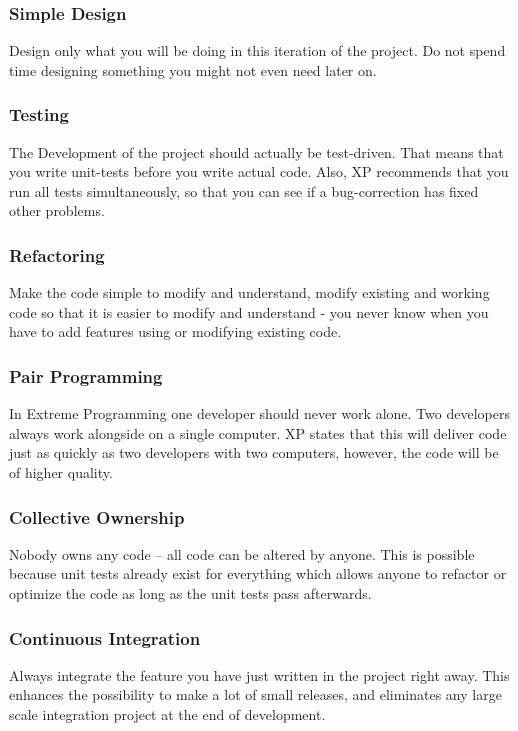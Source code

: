 \subsubsection{Simple Design}
Design only what you will be doing in this iteration of the project. Do not spend time designing something you might not even need later on.

\subsubsection{Testing}
The Development of the project should actually be test-driven.
That means that you write unit-tests before you write actual code.
Also, XP recommends that you run all tests simultaneously, so that you can see if a bug-correction has fixed other problems.

\subsubsection{Refactoring}
Make the code simple to modify and understand, modify existing and working code so that it is easier to modify and understand - you never know when you have to add features using or modifying existing code.

\subsubsection{Pair Programming}
In Extreme Programming one developer should never work alone. Two developers always work alongside on a single computer. XP states that this will deliver code just as quickly as two developers with two computers, however, the code will be of higher quality.

\subsubsection{Collective Ownership}
Nobody owns any code -- all code can be altered by anyone.
This is possible because unit tests already exist for everything which allows anyone to refactor or optimize the code as long as the unit tests pass afterwards.

\subsubsection{Continuous Integration}
Always integrate the feature you have just written in the project right away.
This enhances the possibility to make a lot of small releases, and eliminates any large scale integration project at the end of development.

